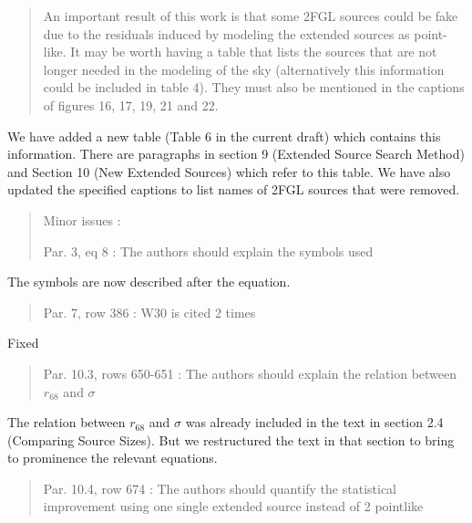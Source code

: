 \documentclass{article}
\newenvironment{referee}
{\begin{quote}\color{red}}
  {\end{quote}}
\newenvironment{reply}
  {}
  {}
\begin{document}
\begin{referee}
An important result of this work is that some 2FGL sources could be fake due to the residuals induced by modeling the extended sources as point-like. It may be worth having a table that lists the sources that are not longer needed in the modeling of the sky (alternatively this information could be included in table 4). They must also be mentioned in the captions of figures 16, 17, 19, 21 and 22.
\end{referee}


\begin{reply}
We have added a new table (Table 6 in the current draft) which contains
this information. There are paragraphs in section 9 (Extended Source
Search Method) and Section 10 (New Extended Sources) which refer to this
table. We have also updated the specified captions to list names of 2FGL
sources that were removed.
\end{reply}


\begin{referee}
Minor issues :

Par. 3, eq 8 : The authors should explain the symbols used
\end{referee}


\begin{reply}
The symbols are now described after the equation.
\end{reply}


\begin{referee}
Par. 7, row 386 : W30 is cited 2 times
\end{referee}


\begin{reply}
Fixed
\end{reply}

\begin{referee}
  Par. 10.3, rows 650-651 : The authors should explain the relation between $r_{68}$ and $\sigma$
\end{referee}

\begin{reply}
  The relation between $r_{68}$ and $\sigma$ was already included in the text
in section 2.4 (Comparing Source Sizes). But we restructured the
text in that section to bring to prominence the relevant equations.
\end{reply}

\begin{referee}
Par. 10.4, row 674 : The authors should quantify the statistical
improvement using one single extended source instead of 2 pointlike
\end{referee}
\end{document}
